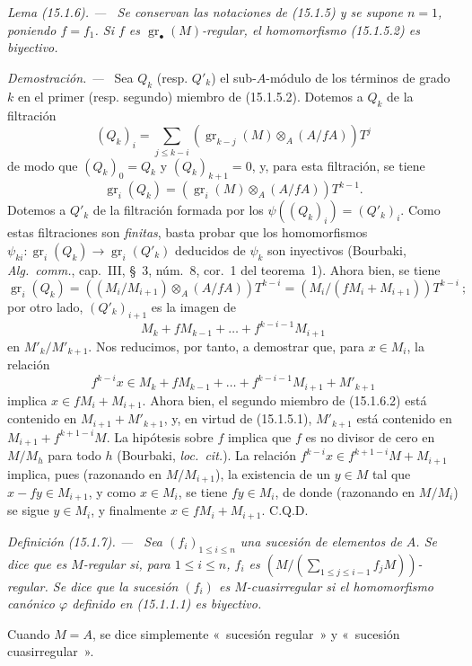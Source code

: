 \documentclass[10pt,oneside]{book}
\makeatletter
\newcommand{\gr}{\operatorname{gr}}
\newcommand{\setmanualcurrentlabel}[1]{\def\@currentlabel{#1}}
\newcommand{\oldpage}[2][]{%
  \setcounter{footnote}{0}%
  \marginpar{\scriptsize\textbf{#1}~|~#2}\ignorespaces}
\newenvironment{definition}[1][]{%
  \setmanualcurrentlabel{#1}\par\medskip\noindent\itshape Definición (#1). ---\ }{\par}
\newenvironment{lemma}[1][]{%
  \setmanualcurrentlabel{#1}\par\medskip\noindent\itshape Lema (#1). ---\ }{\par}
\newenvironment{proof}{%
  \par\medskip\noindent\textit{Demostración. ---\ }}{\par}
\makeatother
\begin{document}
\begin{lemma}[15.1.6]
\label{0.15.1.6-es}
Se conservan las notaciones de (15.1.5) y se supone $n=1$, poniendo $f=f_1$.
Si $f$ es $\gr_\bullet(M)$-regular, el homomorfismo (15.1.5.2) es biyectivo.
\end{lemma}

\begin{proof}
Sea $Q_k$ (resp. $Q'_k$) el sub-$A$-módulo de los términos de grado $k$ en
el primer (resp. segundo) miembro de (15.1.5.2). Dotemos a $Q_k$ de la filtración
\[
  (Q_k)_i=\sum_{j\leq k-i}
  (\gr_{k-j}(M)\otimes_A(A/fA))T^j
  \tag{15.1.6.1}\label{0.15.1.6.1-es}
\]
de modo que $(Q_k)_0=Q_k$ y $(Q_k)_{k+1}=0$, y, para esta filtración, se tiene
\[
  \gr_i(Q_k)=(\gr_i(M)\otimes_A(A/fA))T^{k-1}.
\]
Dotemos a $Q'_k$ de la filtración formada por los
$\psi((Q_k)_i)=(Q'_k)_i$. Como estas filtraciones son \emph{finitas}, basta
probar que los homomorfismos $\psi_{ki}:\gr_i(Q_k)\to\gr_i(Q'_k)$ deducidos de
$\psi_k$ son inyectivos (Bourbaki, \emph{Alg.~comm.}, cap.~III, \S~3,
núm.~8, cor.~1 del teorema~1). Ahora bien, se tiene
\[
  \gr_i(Q_k)=((M_i/M_{i+1})\otimes_A(A/fA))T^{k-i}=(M_i/(fM_i+M_{i+1}))T^{k-i}~;
\]
por otro lado, $(Q'_k)_{i+1}$ es la imagen de
\[
  M_k+fM_{k-1}+\ldots+f^{k-i-1}M_{i+1}
\]
\oldpage[0\textsubscript{IV-1}]{15}
en $M'_k/M'_{k+1}$. Nos reducimos, por tanto, a demostrar que, para $x\in M_i$,
la relación
\[
  f^{k-i}x\in M_k+fM_{k-1}+\ldots+
  f^{k-i-1}M_{i+1}+M'_{k+1}
  \tag{15.1.6.2}\label{0.15.1.6.2-es}
\]
implica $x\in fM_i+M_{i+1}$. Ahora bien, el segundo miembro de (15.1.6.2) está
contenido en $M_{i+1}+M'_{k+1}$, y, en virtud de (15.1.5.1), $M'_{k+1}$ está
contenido en $M_{i+1}+f^{k+1-i}M$. La hipótesis sobre $f$ implica que $f$ es
no divisor de cero en $M/M_h$ para todo $h$ (Bourbaki, \emph{loc.~cit.}). La
relación $f^{k-i}x\in f^{k+1-i}M+M_{i+1}$ implica, pues (razonando en
$M/M_{i+1}$), la existencia de un $y\in M$ tal que $x-fy\in M_{i+1}$, y como
$x\in M_i$, se tiene $fy\in M_i$, de donde (razonando en $M/M_i$) se sigue
$y\in M_i$, y finalmente $x\in fM_i+M_{i+1}$. C.Q.D.
\end{proof}

\begin{definition}[15.1.7]
\label{0.15.1.7-es}
Sea $(f_i)_{1\leq i\leq n}$ una sucesión de elementos de $A$. Se dice que es
$M$-regular si, para $1\leq i\leq n$, $f_i$ es
$\left(M/(\sum_{1\leq j\leq i-1}f_jM)\right)$-regular. Se dice que la sucesión
$(f_i)$ es $M$-cuasirregular si el homomorfismo canónico $\varphi$
definido en (15.1.1.1) es biyectivo.

Cuando $M=A$, se dice simplemente «~sucesión regular~» y
«~sucesión cuasirregular~».
\end{definition}
\end{document}
